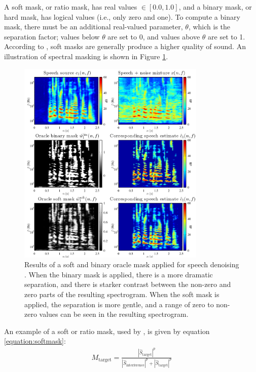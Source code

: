 \documentclass[report.tex]{subfiles}
\begin{document}
A soft mask, or ratio mask, has real values $\in [0.0, 1.0]$, and a binary mask, or hard mask, has logical values (i.e., only zero and one). To compute a binary mask, there must be an additional real-valued parameter, $\theta$, which is the separation factor; values below $\theta$ are set to 0, and values above $\theta$ are set to 1. According to \textcite{masking}, soft masks are generally produce a higher quality of sound. An illustration of spectral masking is shown in Figure \ref{fig:masks}.

\begin{figure}[ht]
	\centering
	\includegraphics[width=0.8\textwidth]{./images-mss/maskdemo.png}
	\caption{Results of a soft and binary oracle mask applied for speech denoising \parencite[71]{masking}. When the binary mask is applied, there is a more dramatic separation, and there is starker contrast between the non-zero and zero parts of the resulting spectrogram. When the soft mask is applied, the separation is more gentle, and a range of zero to non-zero values can be seen in the resulting spectrogram.}
	\label{fig:masks}
\end{figure}

An example of a soft or ratio mask, used by \textcite{fitzgerald1, fitzgerald2}, is given by equation \eqref{equation:softmask}:
\begin{align}
	M_{\text{target}} = \frac{|\hat{S}_{\text{target}}|^{p}}{|\hat{S}_{\text{interference}}|^{p} + |\hat{S}_{\text{target}}|^{p}}\tag{16}\label{equation:softmask}
\end{align}
\end{document}
